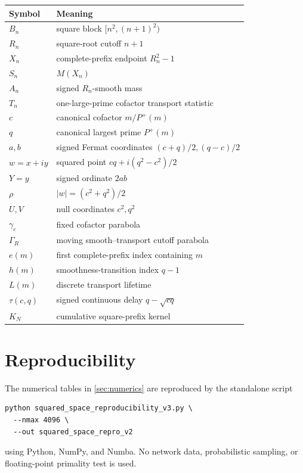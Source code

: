 \documentclass[11pt]{article}
\theoremstyle{definition}
\theoremstyle{remark}
\newcommand{\Pplus}{P^{+}}
\newcommand{\1}{\mathbf{1}}
\begin{document}
\begin{table}[htbp]
\centering
\small
\renewcommand{\arraystretch}{1.25}
\begin{tabular}{ll}
\toprule
Symbol & Meaning\\
\midrule
$B_n$ & square block $[n^2,(n+1)^2)$\\
$R_n$ & square-root cutoff $n+1$\\
$X_n$ & complete-prefix endpoint $R_n^2-1$\\
$S_n$ & $M(X_n)$\\
$A_n$ & signed $R_n$-smooth mass\\
$T_n$ & one-large-prime cofactor transport statistic\\
$c$ & canonical cofactor $m/\Pplus(m)$\\
$q$ & canonical largest prime $\Pplus(m)$\\
$a,b$ & signed Fermat coordinates $(c+q)/2,(q-c)/2$\\
$w=x+iy$ & squared point $cq+i(q^2-c^2)/2$\\
$Y=y$ & signed ordinate $2ab$\\
$\rho$ & $|w|=(c^2+q^2)/2$\\
$U,V$ & null coordinates $c^2,q^2$\\
$\gamma_c$ & fixed cofactor parabola\\
$\Gamma_R$ & moving smooth--transport cutoff parabola\\
$e(m)$ & first complete-prefix index containing $m$\\
$h(m)$ & smoothness-transition index $q-1$\\
$L(m)$ & discrete transport lifetime\\
$\tau(c,q)$ & signed continuous delay $q-\sqrt{cq}$\\
$K_N$ & cumulative square-prefix kernel\\
\bottomrule
\end{tabular}
\end{table}

\section{Reproducibility}
\label{app:reproducibility}

The numerical tables in \cref{sec:numerics} are reproduced by the
standalone script
\begin{verbatim}
python squared_space_reproducibility_v3.py \
  --nmax 4096 \
  --out squared_space_repro_v2
\end{verbatim}
using Python, NumPy, and Numba.  No network data, probabilistic
sampling, or floating-point primality test is used.
\end{document}
